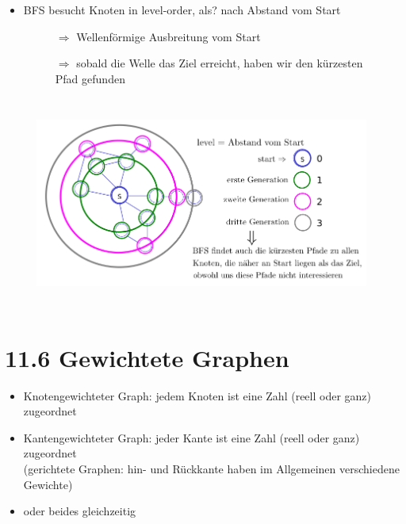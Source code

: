 \documentclass[11pt, fleqn]{scrreprt}
\begin{document}
    \begin{itemize}
        \item BFS besucht Knoten in level-order, als? nach Abstand vom Start
    \end{itemize}
    \begin{figure}[htbp]
        \begin{minipage}{5cm}
            \vspace*{0mm}
            \begin{itemize}
            \item[$\Rightarrow$] Wellenförmige Ausbreitung vom Start
            \item[$\Rightarrow$] sobald die Welle das Ziel erreicht, haben wir den kürzesten Pfad gefunden
            \end{itemize}
        \end{minipage}
        \begin{minipage}{10cm}
            \includegraphics[width=11cm,height=7cm,keepaspectratio]{./Pictures/kurWeg.png}
        \end{minipage}
    \end{figure}

    \section*{11.6 Gewichtete Graphen}
        \begin{itemize}
        \item Knotengewichteter Graph: jedem Knoten ist eine Zahl (reell oder ganz) zugeordnet
        \item Kantengewichteter Graph: jeder Kante ist eine Zahl (reell oder ganz) zugeordnet \\
        (gerichtete Graphen: hin- und Rückkante haben im Allgemeinen verschiedene Gewichte)
        \item oder beides gleichzeitig
        \end{itemize}
\end{document}

